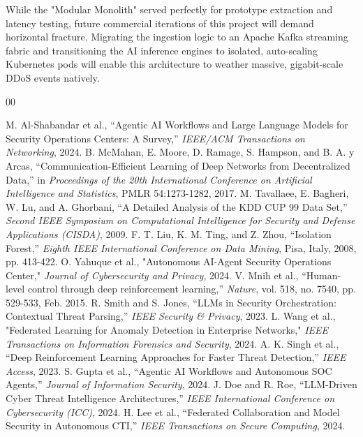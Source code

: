 \documentclass[conference]{IEEEtran}
\begin{document}
While the "Modular Monolith" served perfectly for prototype extraction and latency testing, future commercial iterations of this project will demand horizontal fracture. Migrating the ingestion logic to an Apache Kafka streaming fabric and transitioning the AI inference engines to isolated, auto-scaling Kubernetes pods will enable this architecture to weather massive, gigabit-scale DDoS events natively.

\begin{thebibliography}{00}

 M. Al-Shabandar et al., ``Agentic AI Workflows and Large Language Models for Security Operations Centers: A Survey,'' \textit{IEEE/ACM Transactions on Networking}, 2024.
 B. McMahan, E. Moore, D. Ramage, S. Hampson, and B. A. y Arcas, ``Communication-Efficient Learning of Deep Networks from Decentralized Data,'' in \textit{Proceedings of the 20th International Conference on Artificial Intelligence and Statistics}, PMLR 54:1273-1282, 2017.
 M. Tavallaee, E. Bagheri, W. Lu, and A. Ghorbani, ``A Detailed Analysis of the KDD CUP 99 Data Set,'' \textit{Second IEEE Symposium on Computational Intelligence for Security and Defense Applications (CISDA)}, 2009.
 F. T. Liu, K. M. Ting, and Z. Zhou, ``Isolation Forest,'' \textit{Eighth IEEE International Conference on Data Mining}, Pisa, Italy, 2008, pp. 413-422.
 O. Yahuque et al., "Autonomous AI-Agent Security Operations Center," \textit{Journal of Cybersecurity and Privacy}, 2024.
 V. Mnih et al., ``Human-level control through deep reinforcement learning,'' \textit{Nature}, vol. 518, no. 7540, pp. 529-533, Feb. 2015.
 R. Smith and S. Jones, ``LLMs in Security Orchestration: Contextual Threat Parsing,'' \textit{IEEE Security \& Privacy}, 2023.
 L. Wang et al., "Federated Learning for Anomaly Detection in Enterprise Networks," \textit{IEEE Transactions on Information Forensics and Security}, 2024.
 A. K. Singh et al., ``Deep Reinforcement Learning Approaches for Faster Threat Detection,'' \textit{IEEE Access}, 2023.
 S. Gupta et al., ``Agentic AI Workflows and Autonomous SOC Agents,'' \textit{Journal of Information Security}, 2024.
 J. Doe and R. Roe, ``LLM-Driven Cyber Threat Intelligence Architectures,'' \textit{IEEE International Conference on Cybersecurity (ICC)}, 2024.
 H. Lee et al., ``Federated Collaboration and Model Security in Autonomous CTI,'' \textit{IEEE Transactions on Secure Computing}, 2024.

\end{thebibliography}
\end{document}
